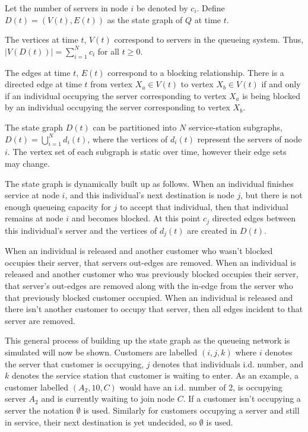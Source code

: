 \documentclass{article}
\begin{document}
Let the number of servers in node $i$ be denoted by $c_i$.
Define $D(t)=(V(t), E(t))$ as the state graph of $Q$ at time $t$.

The vertices at time \(t\), \(V(t)\) correspond to servers in the
queueing system.
Thus, $\left| V\left(D\left(t\right)\right) \right| = \sum_{i=1}^N c_i$ for all $t \geq 0$.

The edges at time \(t\), \(E(t)\) correspond to a blocking relationship.
There is a directed edge at time \(t\) from vertex \(X_a\in V(t)\) to vertex \(X_b\in
V(t)\) if and only if an individual occupying the server corresponding to vertex
\(X_a\) is being blocked by an individual occupying the server corresponding to
vertex \(X_b\).

The state graph $D(t)$ can be partitioned into $N$ service-station subgraphs,
$D(t)=\bigcup_{i=1}^N d_i(t)$, where the vertices of $d_i(t)$ represent the servers of node $i$.
The vertex set of each subgraph is static over time, however their edge sets may
change.

The state graph is dynamically built up as follows.
When an individual finishes service at node $i$, and this individual's next destination is node $j$, but there is not enough queueing capacity for $j$ to accept that individual, then that individual remains at node $i$ and becomes blocked.
At this point $c_j$ directed edges between this individual's server and the vertices of $d_j(t)$ are created in $D(t)$.

When an individual is released and another customer who wasn't blocked occupies their server, that servers out-edges are removed.
When an individual is released and another customer who was previously blocked occupies their server, that server's out-edges are removed along with the in-edge from the server who that previously blocked customer occupied.
When an individual is released and there isn't another customer to occupy that server, then all edges incident to that server are removed.

This general process of building up the state graph as the queueing network is simulated will now be shown.
Customers are labelled $(i, j, k)$ where $i$ denotes the server that customer is occupying, $j$ denotes that individuals i.d. number, and $k$ denotes the service station that customer is waiting to enter.
As an example, a customer labelled $(A_2, 10, C)$ would have an i.d. number of 2, is occupying server $A_2$ and is currently waiting to join node $C$.
If a customer isn't occupying a server the notation $\emptyset$ is used.
Similarly for customers occupying a server and still in service, their next destination is yet undecided, so $\emptyset$ is used.
\end{document}
